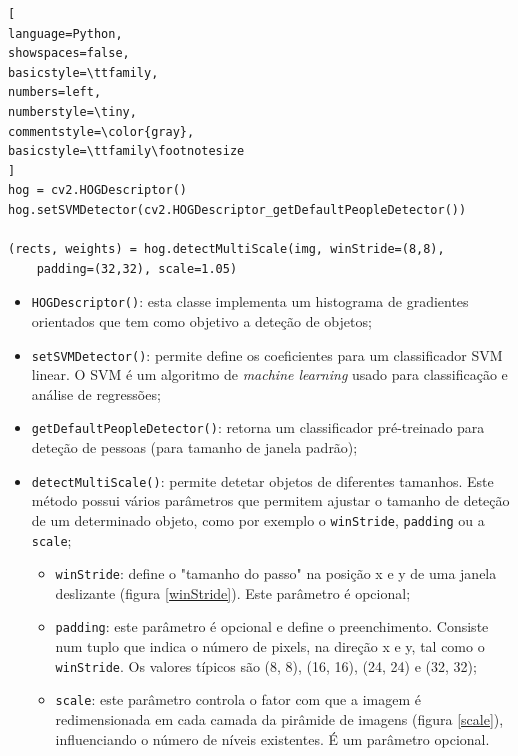 \begin{lstlisting}[
language=Python,
showspaces=false,
basicstyle=\ttfamily,
numbers=left,
numberstyle=\tiny,
commentstyle=\color{gray},
basicstyle=\ttfamily\footnotesize
]
hog = cv2.HOGDescriptor()
hog.setSVMDetector(cv2.HOGDescriptor_getDefaultPeopleDetector())

(rects, weights) = hog.detectMultiScale(img, winStride=(8,8), 
	padding=(32,32), scale=1.05)
\end{lstlisting}
	

\begin{itemize}
	\item \texttt{HOGDescriptor()}: esta classe implementa um histograma de gradientes orientados\cite{Dalal} que tem como objetivo a deteção de objetos; 
	
	\item \texttt{setSVMDetector()}: permite define os coeficientes para um  classificador \ac{SVM} linear. O \ac{SVM} é um algoritmo de \textit{machine learning} usado para classificação e análise de regressões; 
	
	
	\item \texttt{getDefaultPeopleDetector()}: retorna um classificador pré-treinado para deteção de pessoas (para tamanho de janela padrão)\cite{featuredetection}; 
	
	
	\item \texttt{detectMultiScale()}: permite detetar objetos de diferentes tamanhos. Este método possui vários parâmetros que permitem ajustar o tamanho de deteção de um determinado objeto, como por exemplo o \texttt{winStride}, \texttt{padding} ou a \texttt{scale}; 
	
\begin{itemize}
	\item \texttt{winStride}: define o "tamanho do passo" na posição x e y de uma janela deslizante (figura \ref{winStride}). Este parâmetro é opcional;
	 
	\item \texttt{padding}: este parâmetro é opcional e define o preenchimento. Consiste num tuplo que indica o número de pixels, na direção x e y, tal como o \texttt{winStride}. Os valores típicos são (8, 8),  (16, 16), (24, 24) e (32, 32);
	
	\item \texttt{scale}: este parâmetro controla o fator com que a imagem é redimensionada em cada camada da pirâmide de imagens (figura \ref{scale}), influenciando o número de níveis existentes. É um parâmetro opcional. 

\end{itemize}
	
	 
\end{itemize}


